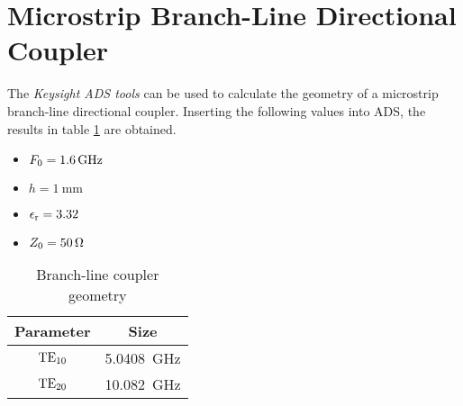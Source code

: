 \section{Microstrip Branch-Line Directional Coupler}
The \emph{Keysight ADS tools} can be used to calculate the geometry of a microstrip branch-line directional coupler.
Inserting the following values into ADS, the results in table \ref{tab:msbldc_geometry} are obtained.
\begin{itemize}
\item $F_{\rm 0} = \SI{1.6}{\giga\hertz}$
\item $h = \SI{1}{\milli\meter}$
\item $\epsilon_{\rm r} = 3.32$
\item $Z_{\rm 0} = \SI{50}{\ohm}$
\end{itemize}

\begin{table}[h t b p]
\centering
\caption{Branch-line coupler geometry}
\begin{tabular}{|c|c|} \hline
Parameter & Size \\ \hline
${\rm TE}_{\rm 10}$ & \SI{5.0408}{\giga\hertz} \\
${\rm TE}_{\rm 20}$ & \SI{10.082}{\giga\hertz} \\ \hline
\end{tabular}
\label{tab:msbldc_geometry}
\end{table}